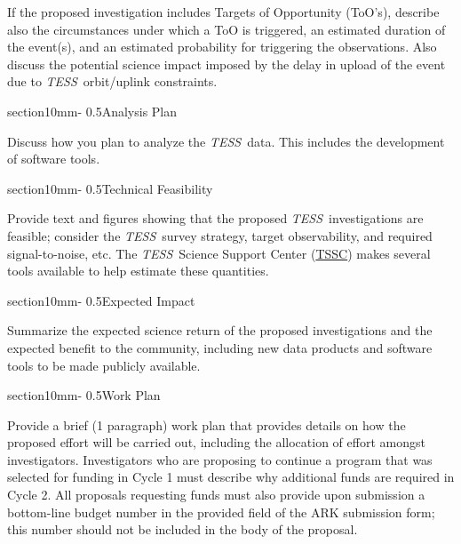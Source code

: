 \documentclass[letterpaper,11pt]{article}
\makeatletter
\renewcommand{\section}{\@startsection%
{section}{1}{0mm}{-\baselineskip}%
{0.5\baselineskip}{\normalfont\Large\bfseries}}%
\newcommand{\tess}{{\it TESS}}
\makeatother
\begin{document}
If the proposed investigation includes Targets of Opportunity (ToO's), describe also the circumstances
under which a ToO is triggered, an estimated duration of the event(s), and an estimated probability for
triggering the observations. Also discuss the potential science impact imposed by the delay in upload
of the event due to \tess\ orbit/uplink constraints.


\section{Analysis Plan}

Discuss how you plan to analyze the \tess\ data. This includes the development of software tools.


\section{Technical Feasibility}

Provide text and figures showing that the proposed \tess\ investigations are feasible; consider the
\tess\ survey strategy, target observability, and required signal-to-noise, etc. The \tess\ Science
Support Center (\href{https://heasarc.gsfc.nasa.gov/docs/tess/}{TSSC}) makes several tools available to help estimate these quantities.


\section{Expected Impact}

Summarize the expected science return of the proposed investigations and the expected benefit
to the community, including new data products and software tools to be made publicly available.


\section{Work Plan}

Provide a brief (1 paragraph) work plan that provides details on how the proposed effort will be carried out, including the allocation of effort amongst investigators. Investigators who are proposing to continue a program that was selected for funding in Cycle 1 must describe why additional funds are required in Cycle 2. All proposals requesting funds must also provide upon submission a bottom-line budget number in the provided field of the ARK submission form; this number should not be included in the body of the proposal.
\end{document}

